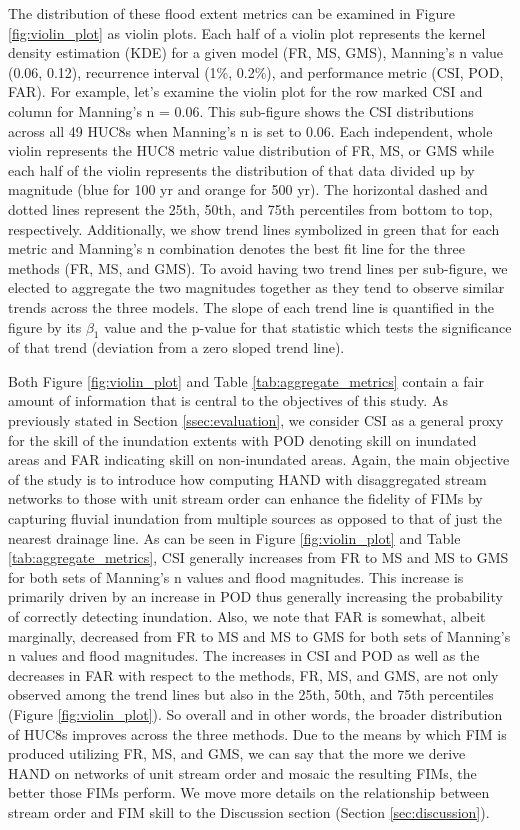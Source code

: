 \documentclass[draft]{dependencies/agujournal2019}
\begin{document}
The distribution of these flood extent metrics can be examined in Figure \ref{fig:violin_plot} as violin plots.
Each half of a violin plot represents the kernel density estimation (KDE) for a given model (FR, MS, GMS), Manning's n value (0.06, 0.12), recurrence interval (1\%, 0.2\%), and performance metric (CSI, POD, FAR).
For example, let's examine the violin plot for the row marked CSI and column for Manning's n = 0.06.
This sub-figure shows the CSI distributions across all 49 HUC8s when Manning's n is set to 0.06.
Each independent, whole violin represents the HUC8 metric value distribution of FR, MS, or GMS while each half of the violin represents the distribution of that data divided up by magnitude (blue for 100 yr and orange for 500 yr).
The horizontal dashed and dotted lines represent the 25th, 50th, and 75th percentiles from bottom to top, respectively.
Additionally, we show trend lines symbolized in green that for each metric and Manning's n combination denotes the best fit line for the three methods (FR, MS, and GMS).
To avoid having two trend lines per sub-figure, we elected to aggregate the two magnitudes together as they tend to observe similar trends across the three models.
The slope of each trend line is quantified in the figure by its $\beta_1$ value and the p-value for that statistic which tests the significance of that trend (deviation from a zero sloped trend line).

Both Figure \ref{fig:violin_plot} and Table \ref{tab:aggregate_metrics} contain a fair amount of information that is central to the objectives of this study.
As previously stated in Section \ref{ssec:evaluation}, we consider CSI as a general proxy for the skill of the inundation extents with POD denoting skill on inundated areas and FAR indicating skill on non-inundated areas.
Again, the main objective of the study is to introduce how computing HAND with disaggregated stream networks to those with unit stream order can enhance the fidelity of FIMs by capturing fluvial inundation from multiple sources as opposed to that of just the nearest drainage line.
As can be seen in Figure \ref{fig:violin_plot} and Table \ref{tab:aggregate_metrics}, CSI generally increases from FR to MS and MS to GMS for both sets of Manning's n values and flood magnitudes.
This increase is primarily driven by an increase in POD thus generally increasing the probability of correctly detecting inundation.
Also, we note that FAR is somewhat, albeit marginally, decreased from FR to MS and MS to GMS for both sets of Manning's n values and flood magnitudes.
The increases in CSI and POD as well as the decreases in FAR with respect to the methods, FR, MS, and GMS, are not only observed among the trend lines but also in the 25th, 50th, and 75th percentiles (Figure \ref{fig:violin_plot}).
So overall and in other words, the broader distribution of HUC8s improves across the three methods.
Due to the means by which FIM is produced utilizing FR, MS, and GMS, we can say that the more we derive HAND on networks of unit stream order and mosaic the resulting FIMs, the better those FIMs perform.
We move more details on the relationship between stream order and FIM skill to the Discussion section (Section \ref{sec:discussion}).
\end{document}
